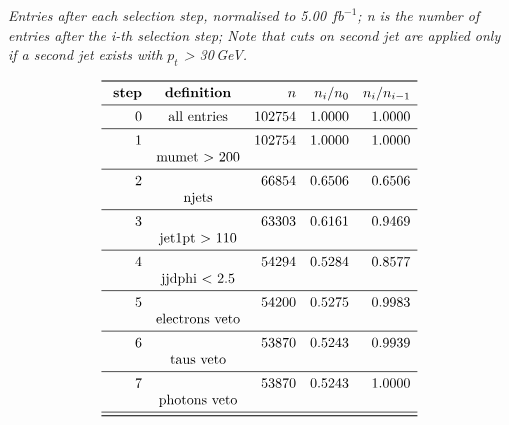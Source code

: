 \documentclass[11pt,a4paper]{article}
\begin{document}
\begin{table}
\caption{\emph{Entries after each selection step, normalised to 5.00 $fb^{-1}$; n is the number of entries after the i-th selection step; Note that cuts on second jet are applied only if a second jet exists with $p_t$ > 30\,GeV.}}
\[
\begin{array}{rcrrr}
\toprule
\ \textbf{step}& \textbf{definition}  & n  &  n_i/n_0 & n_i/n_{i-1}  \\ 
\midrule
 0  & \text{all entries} & 102754 & 1.0000 & 1.0000 \\
\midrule
 1  & & 102754 & 1.0000 & 1.0000 \\
& \text{mumet > 200} & & & \\
\midrule
 2  & &  66854 & 0.6506 & 0.6506 \\
& \text{njets} & & & \\
\midrule
 3  & &  63303 & 0.6161 & 0.9469 \\
& \text{jet1pt >  110} & & & \\
\midrule
 4  & &  54294 & 0.5284 & 0.8577 \\
& \text{jjdphi < 2.5} & & & \\
\midrule
 5  & &  54200 & 0.5275 & 0.9983 \\
& \text{electrons veto} & & & \\
\midrule
 6  & &  53870 & 0.5243 & 0.9939 \\
& \text{taus veto} & & & \\
\midrule
 7  & &  53870 & 0.5243 & 1.0000 \\
& \text{photons veto} & & & \\
\midrule
\bottomrule
\end{array}
\]
\end{table}
\end{document}
